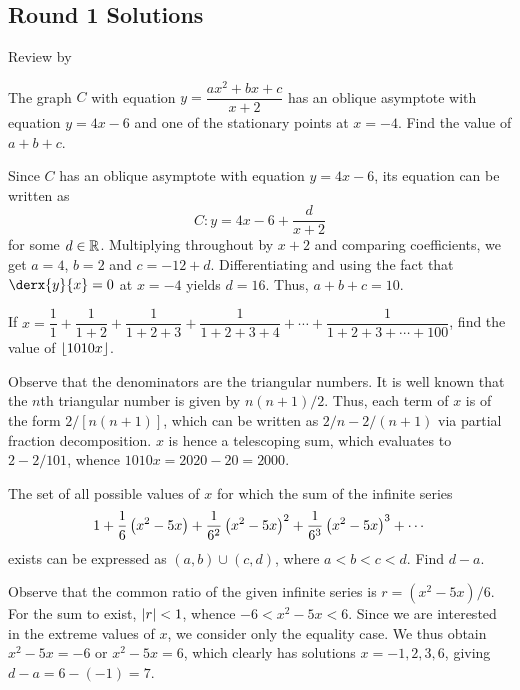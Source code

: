 \subsection{Round 1 Solutions}\label{S::2023-O-1}

\begin{resources}
    Review by 
\end{resources}

\begin{question}[10]\label{Q::2023-O-1-1}
    The graph $C$ with equation $y = \dfrac{ax^2 + bx + c}{x+2}$ has an oblique asymptote with equation $y = 4x - 6$ and one of the stationary points at $x = -4$. Find the value of $a + b + c$.
\end{question}
\begin{solution*}
    Since $C$ has an oblique asymptote with equation $y = 4x - 6$, its equation can be written as \[C: y = 4x - 6 + \frac{d}{x+2}\] for some $d \in \mathbb{R}$. Multiplying throughout by $x+2$ and comparing coefficients, we get $a = 4$, $b = 2$ and $c = -12 + d$. Differentiating and using the fact that $\derx{y}{x} = 0$ at $x = -4$ yields $d = 16$. Thus, $a + b + c = 10$.
\end{solution*}

\begin{question}[2000]\label{Q::2023-O-1-2}
    If $x = \dfrac{1}{1} + \dfrac{1}{1+2} + \dfrac{1}{1+2+3} + \dfrac{1}{1+2+3+4} + \cdots + \dfrac{1}{1 + 2 + 3 + \cdots + 100}$, find the value of $\left\lfloor 1010x \right\rfloor$.
\end{question}
\begin{solution*}
    Observe that the denominators are the triangular numbers. It is well known that the $n$th triangular number is given by $n(n+1)/2$. Thus, each term of $x$ is of the form $2/[n(n+1)]$, which can be written as $2/n - 2/(n+1)$ via partial fraction decomposition. $x$ is hence a telescoping sum, which evaluates to $2 - 2/101$, whence $1010x = 2020 - 20 = 2000$.
\end{solution*}

\begin{question}[7]\label{Q::2023-O-1-3}
    The set of all possible values of $x$ for which the sum of the infinite series \[1 + \dfrac16 \left( x^2 - 5x \right) + \dfrac1{6^2} \left( x^2 - 5x \right)^2 + \dfrac1{6^3} \left( x^2 - 5x \right)^3 + \cdots\] exists can be expressed as $(a, b) \cup (c, d)$, where $a < b < c < d$. Find $d - a$.
\end{question}
\begin{solution*}
    Observe that the common ratio of the given infinite series is $r = (x^2 - 5x)/6$. For the sum to exist, $\left\lvert r \right\rvert < 1$, whence $-6 < x^2 - 5x < 6$. Since we are interested in the extreme values of $x$, we consider only the equality case. We thus obtain $x^2 - 5x = -6$ or $x^2 - 5x = 6$, which clearly has solutions $x = -1, 2, 3, 6$, giving $d - a = 6 - (-1) = 7$.
\end{solution*}

